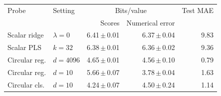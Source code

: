 \begin{tabular}{llrrr}
\toprule
Probe & Setting & \multicolumn{2}{c}{Bits/value} & Test MAE \\
 & & Scores & Numerical error & \\
\midrule
Scalar ridge & $\lambda=0$ & 6.41\,$\pm$\,0.01 & 6.37\,$\pm$\,0.04 & 9.83 \\
Scalar PLS & $k=32$ & 6.38\,$\pm$\,0.01 & 6.36\,$\pm$\,0.02 & 9.36 \\
Circular reg. & $d=4096$ & 4.65\,$\pm$\,0.01 & 4.56\,$\pm$\,0.10 & 0.79 \\
Circular reg. & $d=10$ & 5.66\,$\pm$\,0.07 & 3.78\,$\pm$\,0.04 & 1.63 \\
Circular cls. & $d=10$ & 4.24\,$\pm$\,0.07 & 4.50\,$\pm$\,0.24 & 1.14 \\
\bottomrule
\end{tabular}
